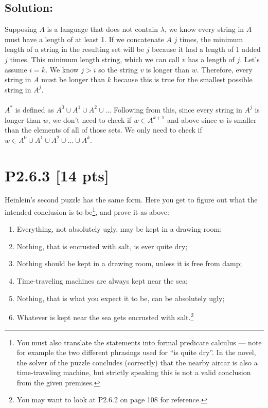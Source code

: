 \documentclass[12pt]{article}
\begin{document}
\subsection*{\textbf{Solution:}}
Supposing $A$ is a language that does not contain $\lambda$, we know every string in $A$ must have a length of at least 1. If we concatenate $A$ $j$ times, the minimum length of a string in the resulting set will be $j$ because it had a length of 1 added $j$ times. This minimum length string, which we can call $v$ has a length of $j$. Let's assume $i = k$. We know $j  > i$ so the string $v$ is longer than $w$. Therefore, every string in $A$ must be longer than $k$ because this is true for the smallest possible string in $A^{j}$. \\\\
$A^{*}$ is defined as $A^{0} \cup A^{1} \cup A^{2} \cup \ldots$ Following from this, since every string in $A^{j}$ is longer than $w$, we don't need to check if $w \in A^{k+1}$ and above since $w$ is smaller than the elements of all of those sets. We only need to check if $w \in A^{0} \cup A^{1} \cup A^{2} \cup \ldots \cup A^{k}$.



\newpage
\section*{\textbf{P2.6.3} [14 pts]}
Heinlein’s second puzzle has the same form. Here you get to figure out what the intended conclusion is to be\footnote{You must also translate the statements into formal predicate calculus — note for example the two different phrasings used for “is quite dry”. In the novel, the solver of the puzzle concludes (correctly) that the nearby aircar is also a time-traveling machine, but strictly speaking this is not a valid conclusion from the given premises.}, and prove it as above:
\begin{enumerate}
    \item Everything, not absolutely ugly, may be kept in a drawing room;

    \item Nothing, that is encrusted with salt, is ever quite dry;

    \item Nothing should be kept in a drawing room, unless it is free from damp;

    \item Time-traveling machines are always kept near the sea;

    \item Nothing, that is what you expect it to be, can be absolutely ugly;

    \item Whatever is kept near the sea gets encrusted with salt.\footnote{You may want to look at P2.6.2 on page 108 for reference.}
\end{enumerate}
\end{document}
